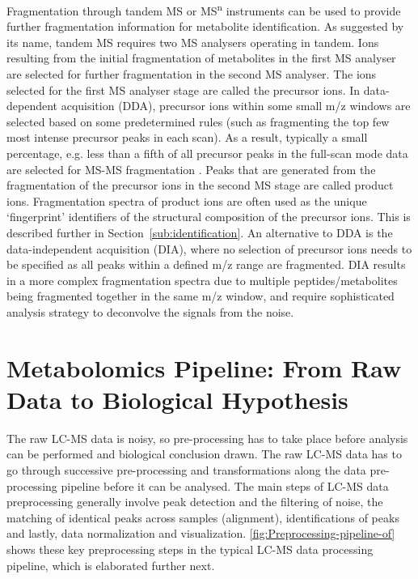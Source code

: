Fragmentation through tandem MS or MS\textsuperscript{n} instruments can be used to provide further fragmentation information for metabolite identification. As suggested by its name, tandem MS requires two MS analysers operating in tandem. Ions resulting from the initial fragmentation of metabolites in the first MS analyser are selected for further fragmentation in the second MS analyser. The ions selected for the first MS analyser stage are called the precursor ions. In data-dependent acquisition (DDA), precursor ions within some small m/z windows are selected based on some predetermined rules (such as fragmenting the top few most intense precursor peaks in each scan). As a result, typically a small percentage, e.g. less than a fifth of all precursor peaks in the full-scan mode data are selected for MS-MS fragmentation \cite{Smith2004}. Peaks that are generated from the fragmentation of the precursor ions in the second MS stage are called product ions. Fragmentation spectra of product ions are often used as the unique `fingerprint' identifiers of the structural composition of the precursor ions. This is described further in Section~\ref{sub:identification}. An alternative to DDA is the data-independent acquisition (DIA), where no selection of precursor ions needs to be specified as all peaks within a defined m/z range are fragmented. DIA results in a more complex fragmentation spectra due to multiple peptides/metabolites being fragmented together in the same m/z window, and require sophisticated analysis strategy to deconvolve the signals from the noise. 

\section{Metabolomics Pipeline: From Raw Data to Biological Hypothesis}

The raw LC-MS data is noisy, so pre-processing has to take place before analysis can be performed and biological conclusion drawn. The raw LC-MS data has to go through successive pre-processing and transformations along the data pre-processing pipeline before it can be analysed. The main steps of LC-MS data preprocessing generally involve peak detection and the filtering of noise, the matching of identical peaks across samples (alignment), identifications of peaks and lastly, data normalization and visualization. \ref{fig:Preprocessing-pipeline-of} shows these key preprocessing steps in the typical LC-MS data processing pipeline, which is elaborated further next.

